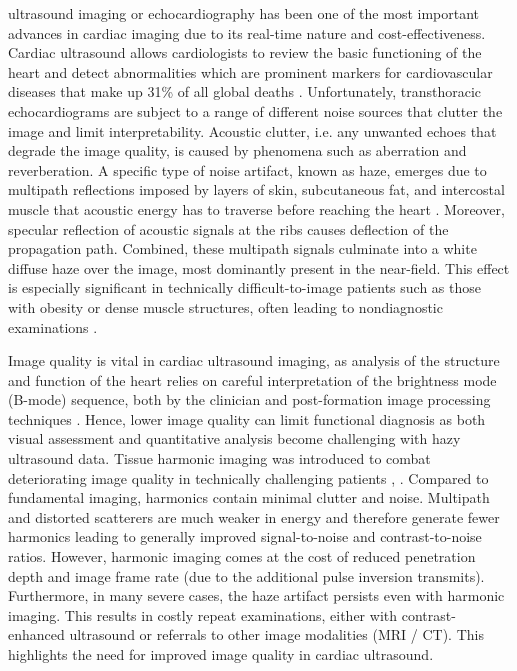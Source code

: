 \documentclass[journal,twoside,web]{ieeecolor}
\begin{document}
 ultrasound imaging or echocardiography has been one of the most important advances in cardiac imaging due to its real-time nature and cost-effectiveness. Cardiac ultrasound allows cardiologists to review the basic functioning of the heart and detect abnormalities which are prominent markers for cardiovascular diseases that make up 31\% of all global deaths \cite{daveRecentTechnologicalAdvancements2018}. Unfortunately, transthoracic echocardiograms are subject to a range of different noise sources that clutter the image and limit interpretability. Acoustic clutter, i.e. any unwanted echoes that degrade the image quality, is caused by phenomena such as aberration and reverberation. A specific type of noise artifact, known as haze, emerges due to multipath reflections imposed by layers of skin, subcutaneous fat, and intercostal muscle that acoustic energy has to traverse before reaching the heart \cite{fatemiStudyingOriginReverberation2019}. Moreover, specular reflection of acoustic signals at the ribs causes deflection of the propagation path. Combined, these multipath signals culminate into a white diffuse haze over the image, most dominantly present in the near-field. This effect is especially significant in technically difficult-to-image patients such as those with obesity or dense muscle structures, often leading to nondiagnostic examinations \cite{uppotImpactObesityRadiology2007}.

Image quality is vital in cardiac ultrasound imaging, as analysis of the structure and function of the heart relies on careful interpretation of the brightness mode (B-mode) sequence, both by the clinician and post-formation image processing techniques \cite{sassaroliImageQualityEvaluation2019, chenDeepLearningCardiac2020}. Hence, lower image quality can limit functional diagnosis as both visual assessment and quantitative analysis become challenging with hazy ultrasound data. Tissue harmonic imaging was introduced to combat deteriorating image quality in technically challenging patients \cite{tranquartClinicalUseUltrasound1999}, \cite{wellsUltrasoundImaging2006}. Compared to fundamental imaging, harmonics contain minimal clutter and noise. Multipath and distorted scatterers are much weaker in energy and therefore generate fewer harmonics leading to generally improved signal-to-noise and contrast-to-noise ratios. However, harmonic imaging comes at the cost of reduced penetration depth and image frame rate (due to the additional pulse inversion transmits). Furthermore, in many severe cases, the haze artifact persists even with harmonic imaging. This results in costly repeat examinations, either with contrast-enhanced ultrasound or referrals to other image modalities (MRI / CT). This highlights the need for improved image quality in cardiac ultrasound. 
\end{document}
